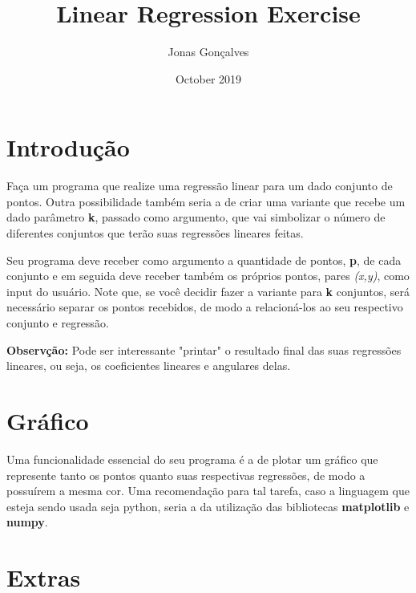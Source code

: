 \documentclass{article}
\title{Linear Regression Exercise}
\author{Jonas Gonçalves}
\date{October 2019}
\begin{document}
\maketitle

\section{Introdução}

Faça um programa que realize uma regressão linear para um dado conjunto de pontos. Outra possibilidade também seria a de criar uma variante que recebe um dado parâmetro \textbf{k}, passado como argumento, que vai simbolizar o número de diferentes conjuntos que terão suas regressões lineares feitas. \par
Seu programa deve receber como argumento a quantidade de pontos, \textbf{p}, de cada conjunto e em seguida deve receber também os próprios pontos, pares \textit{(x,y)}, como input do usuário. Note que, se você decidir fazer a variante para \textbf{k} conjuntos, será necessário separar os pontos recebidos, de modo a relacioná-los ao seu respectivo conjunto e regressão.\par
\textbf{Observção:} Pode ser interessante "printar" o resultado final das suas regressões lineares, ou seja, os coeficientes lineares e angulares delas.

\section{Gráfico}

Uma funcionalidade essencial do seu programa é a de plotar um gráfico que represente tanto os pontos quanto suas respectivas regressões, de modo a possuírem a mesma cor. Uma recomendação para tal tarefa, caso a linguagem que esteja sendo usada seja python, seria a da utilização das bibliotecas \textbf{matplotlib} e \textbf{numpy}.

\section{Extras}
\end{document}
